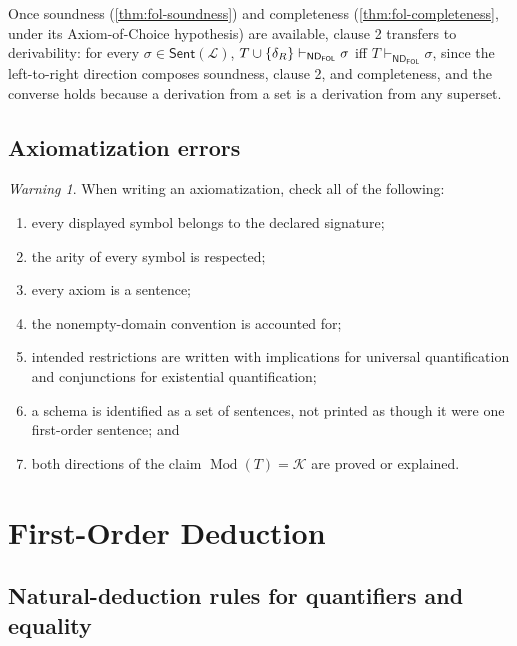 \documentclass[11pt,oneside,openany]{book}
\theoremstyle{definition}
\theoremstyle{plain}
\theoremstyle{remark}
\newtheorem{warning}[definition]{Warning}
\DeclarePairedDelimiter{\set}{\lbrace}{\rbrace}
\newcommand{\Lang}{\mathcal{L}}
\newcommand{\Sent}{\mathsf{Sent}}
\newcommand{\Mod}{\operatorname{Mod}}
\newcommand{\derives}{\vdash}
\newcommand{\ND}{\mathsf{ND}}
\newcommand{\FOL}{\mathsf{FOL}}
\begin{document}
Once soundness (\cref{thm:fol-soundness}) and completeness
(\cref{thm:fol-completeness}, under its Axiom-of-Choice hypothesis) are
available, clause 2 transfers to derivability: for every
\(\sigma\in\Sent(\Lang)\),
\(T\cup\set{\delta_R}\derives_{\ND_{\FOL}}\sigma\) iff
\(T\derives_{\ND_{\FOL}}\sigma\), since the left-to-right direction
composes soundness, clause 2, and completeness, and the converse holds
because a derivation from a set is a derivation from any superset.

\section{Axiomatization errors}
\label{sec:fol-theories-01}

\begin{warning}
When writing an axiomatization, check all of the following:
\begin{enumerate}
  \item every displayed symbol belongs to the declared signature;
  \item the arity of every symbol is respected;
  \item every axiom is a sentence;
  \item the nonempty-domain convention is accounted for;
  \item intended restrictions are written with implications for universal
        quantification and conjunctions for existential quantification;
  \item a schema is identified as a set of sentences, not printed as though it
        were one first-order sentence; and
  \item both directions of the claim \(\Mod(T)=\mathcal K\) are proved or
        explained.
\end{enumerate}
\end{warning}

\chapter{First-Order Deduction}
\label{ch:fol-deduction}

\section{Natural-deduction rules for quantifiers and equality}
\label{sec:fol-deduction-01}
\end{document}
